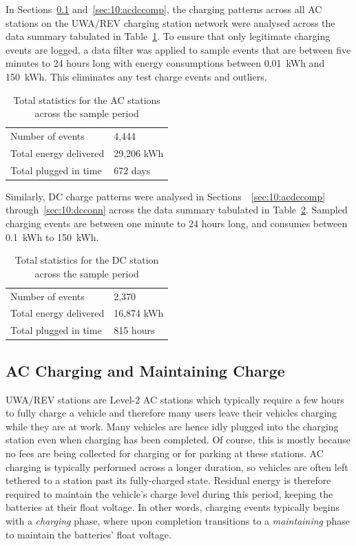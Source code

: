 In Sections~\ref{sec:10:ac} and~\ref{sec:10:acdccomp}, the charging patterns across all AC stations on the UWA/REV charging station network were analysed across the data summary tabulated in Table~\ref{tbl:10:acstats}. To ensure that only legitimate charging events are logged, a data filter was applied to sample events that are between five minutes to 24 hours long with energy consumptions between 0.01~kWh and 150~kWh. This eliminates any test charge events and outliers.

\begin{table}[H]
	\centering
	\caption{Total statistics for the AC stations across the sample period}
	\label{tbl:10:acstats}
	\begin{tabular}{ll}
		\toprule
		Number of events & 4,444 \\
		Total energy delivered & 29,206 kWh \\
		Total plugged in time & 672 days \\
		\bottomrule
	\end{tabular}
\end{table}

Similarly, DC charge patterns were analysed in Sections~~\ref{sec:10:acdccomp} through~\ref{sec:10:dcconn} across the data summary tabulated in Table~\ref{tbl:10:dcstats}. Sampled charging events are between one minute to 24 hours long, and consumes between 0.1~kWh to 150~kWh.

\begin{table}[H]
	\centering
	\caption{Total statistics for the DC station across the sample period}
	\label{tbl:10:dcstats}
	\begin{tabular}{ll}
		\toprule
		Number of events & 2,370 \\
		Total energy delivered & 16,874 kWh \\
		Total plugged in time & 815 hours \\
		\bottomrule
	\end{tabular}
\end{table}

\subsection{AC Charging and Maintaining Charge}
\label{sec:10:ac}
UWA/REV stations are Level-2 AC stations which typically require a few hours to fully charge a vehicle and therefore many users leave their vehicles charging while they are at work. Many vehicles are hence idly plugged into the charging station even when charging has been completed. Of course, this is mostly because no fees are being collected for charging or for parking at these stations. AC charging is typically performed across a longer duration, so vehicles are often left tethered to a station past its fully-charged state. Residual energy is therefore required to maintain the vehicle's charge level during this period, keeping the batteries at their float voltage. In other words, charging events typically begins with a \textit{charging} phase, where upon completion transitions to a \textit{maintaining} phase to maintain the batteries' float voltage. 

